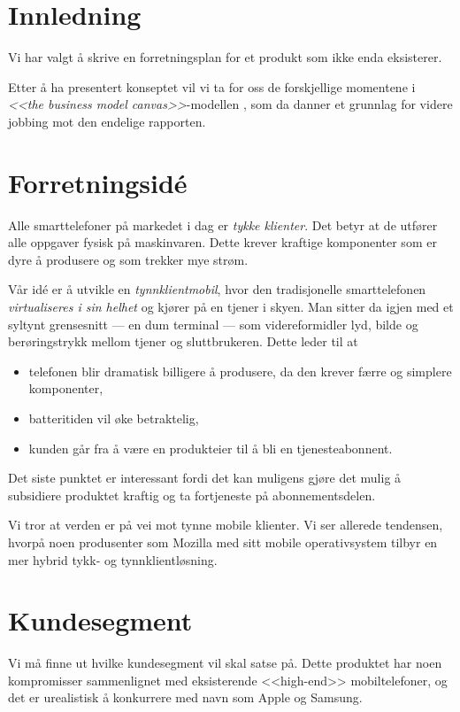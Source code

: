 \section{Innledning}

Vi har valgt å skrive en forretningsplan for et produkt som ikke enda
eksisterer.

Etter å ha presentert konseptet vil vi ta for oss de forskjellige momentene i
\textit{<<the business model canvas>>}-modellen \cite{osterwalder}, som da
danner et grunnlag for videre jobbing mot den endelige rapporten.

\section{Forretningsidé}

Alle smarttelefoner på markedet i dag er \textit{tykke klienter}. Det betyr at
de utfører alle oppgaver fysisk på maskinvaren. Dette krever kraftige
komponenter som er dyre å produsere og som trekker mye strøm.

Vår idé er å utvikle en \textit{tynnklientmobil}, hvor den tradisjonelle
smarttelefonen \textit{virtualiseres i sin helhet} og kjører på en tjener i
skyen. Man sitter da igjen med et syltynt grensesnitt --- en dum terminal ---
som videreformidler lyd, bilde og berøringstrykk
mellom tjener og sluttbrukeren. Dette leder
til at

\begin{itemize}
  \item telefonen blir dramatisk billigere å produsere, da den krever færre og
    simplere komponenter,
  \item batteritiden vil øke betraktelig,
  \item kunden går fra å være en produkteier til å bli en tjenesteabonnent.
\end{itemize}

Det siste punktet er interessant fordi det kan muligens gjøre det mulig å
subsidiere produktet kraftig og ta fortjeneste på abonnementsdelen.

Vi tror at verden er på vei mot tynne mobile klienter. Vi ser allerede
tendensen, hvorpå noen produsenter som Mozilla med sitt mobile operativsystem
tilbyr en mer hybrid tykk- og tynnklientløsning.

\section{Kundesegment}

Vi må finne ut hvilke kundesegment vil skal satse på. Dette produktet har noen
kompromisser sammenlignet med eksisterende <<high-end>> mobiltelefoner, og det
er urealistisk å konkurrere med navn som Apple og Samsung.

